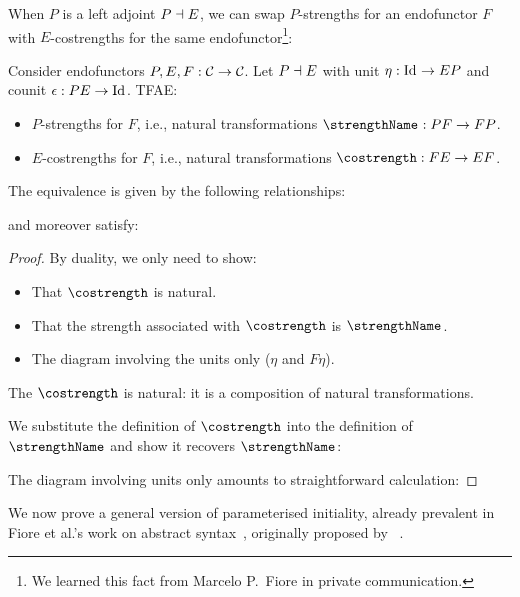 When $P$ is a left adjoint $P \dashv E$, we can swap
$P$-strengths for an endofunctor $F$ with $E$-costrengths for the same
endofunctor\footnote{We learned this fact from Marcelo
P.~Fiore in private communication.}:
\begin{lemma}
  Consider endofunctors $P, E, F : \mathcal{C}\/ \to \mathcal{C}\/$. Let $P
  \dashv E$ with unit $\eta : {\rm Id}_{{}} \to EP$ and counit $\epsilon :
  PE \to \Id$. TFAE:
  \begin{itemize}
  \item $P$-strengths for $F$, i.e., natural transformations
    $\strength : PF \to FP$.
  \item $E$-costrengths for $F$, i.e., natural transformations
    $\costrength : FE \to EF$.
  \end{itemize}
  The equivalence is given by the following relationships:
  \begin{center}
     \qquad
  \end{center}
  and moreover satisfy:
  \begin{center}
    \qquad
  \end{center}
\end{lemma}
\begin{proof}
  By duality, we only need to show:
  \begin{itemize}
  \item That $\costrength$ is natural.
  \item That the strength associated with $\costrength$ is $\strength$.
  \item The diagram involving the units only ($\eta$ and $F\eta$).
  \end{itemize}

  The $\costrength$ is natural: it is a
  composition of natural transformations.

  We substitute the definition of $\costrength$ into the definition of
  $\strength$ and show it recovers $\strength$:

  The diagram involving units only amounts to straightforward
  calculation:
\end{proof}

We now prove a general version of parameterised initiality, already
prevalent in Fiore et al.'s work on abstract
syntax~\cite{fiore-szamozvancev:formal-soas,%
  fiore-szamozvancev:soas-theory,%
  fiore-ranchod:substructural-ast}, originally proposed by
\citeauthor{bird-paterson:generalised-folds-for-nested-datatypes}~\cite{%
  bird-paterson:generalised-folds-for-nested-datatypes}.

